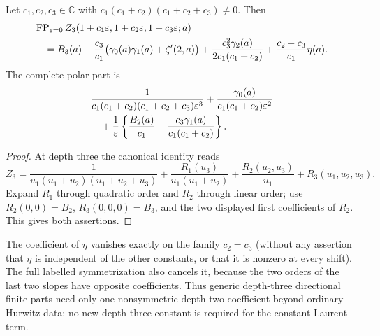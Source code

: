 \begin{theorem}
\label{ord:threedirections}
Let $c_1,c_2,c_3\in\mathbb C$ with
$c_1(c_1+c_2)(c_1+c_2+c_3)\ne0$. Then
\begin{align}\label{ord:threeFP}
 &\operatorname{FP}_{\varepsilon=0}
 Z_3(1+c_1\varepsilon,1+c_2\varepsilon,1+c_3\varepsilon;a)
 \notag\\
 &\quad=B_3(a)-\frac{c_3}{c_1}
       \bigl(\gamma_0(a)\gamma_1(a)+\zeta'(2,a)\bigr)
 +\frac{c_3^2\gamma_2(a)}{2c_1(c_1+c_2)}
 +\frac{c_2-c_3}{c_1}\eta(a).
\end{align}
The complete polar part is
\begin{align}\label{ord:threepoles}
 &\frac{1}{c_1(c_1+c_2)(c_1+c_2+c_3)\varepsilon^3}
 +\frac{\gamma_0(a)}{c_1(c_1+c_2)\varepsilon^2}\notag\\
 &\quad+\frac1\varepsilon
 \left\{\frac{B_2(a)}{c_1}
       -\frac{c_3\gamma_1(a)}{c_1(c_1+c_2)}\right\}.
\end{align}
\end{theorem}

\begin{proof}
At depth three the canonical identity reads
\[
 Z_3=\frac1{u_1(u_1+u_2)(u_1+u_2+u_3)}
 +\frac{R_1(u_3)}{u_1(u_1+u_2)}
 +\frac{R_2(u_2,u_3)}{u_1}+R_3(u_1,u_2,u_3).
\]
Expand $R_1$ through quadratic order and $R_2$ through linear order;
use $R_2(0,0)=B_2$, $R_3(0,0,0)=B_3$, and the two displayed
first coefficients of $R_2$. This gives both assertions.
\end{proof}

The coefficient of $\eta$ vanishes exactly on the family $c_2=c_3$
(without any assertion that $\eta$ is independent of the other constants,
or that it is nonzero at every shift).
The full labelled symmetrization also cancels it, because the two
orders of the last two slopes have opposite coefficients.
Thus generic depth-three directional finite parts need only one
nonsymmetric depth-two coefficient beyond ordinary Hurwitz data;
no new depth-three constant is required for the constant Laurent term.

